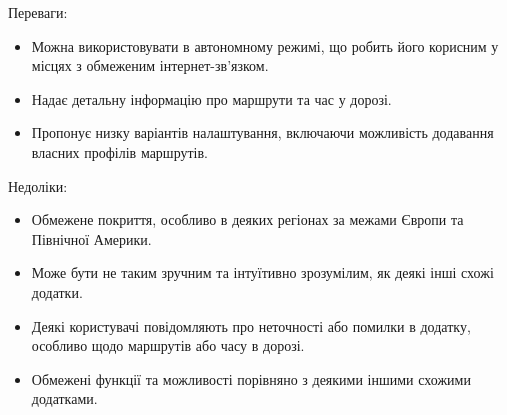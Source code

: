 Переваги:
\begin{itemize}
    \item Можна використовувати в автономному режимі, що робить його 
    корисним у місцях з обмеженим інтернет-зв'язком.
    \item Надає детальну інформацію про маршрути та час у дорозі.
    \item Пропонує низку варіантів налаштування, включаючи можливість 
    додавання власних профілів маршрутів.
\end{itemize}

Недоліки:
\begin{itemize}
    \item Обмежене покриття, особливо в деяких регіонах за межами 
    Європи та Північної Америки.
    \item Може бути не таким зручним та інтуїтивно зрозумілим, як 
    деякі інші схожі додатки.
    \item Деякі користувачі повідомляють про неточності або помилки в 
    додатку, особливо щодо маршрутів або часу в дорозі.
    \item Обмежені функції та можливості порівняно з деякими іншими 
    схожими додатками.
\end{itemize}
